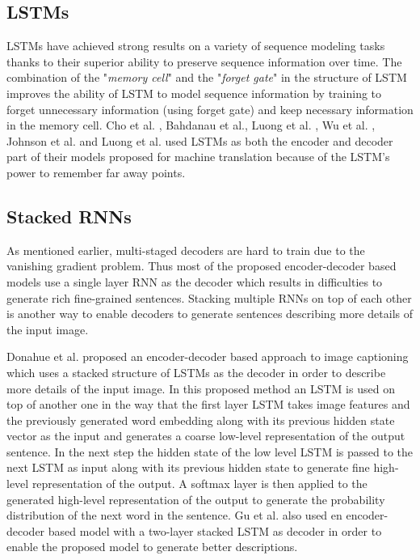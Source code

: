 \documentclass[preprint, 12pt]{elsarticle}
\begin{document}
		\subsection{LSTMs}
		LSTMs have achieved strong results on a variety of sequence modeling tasks thanks to their superior ability to preserve sequence information over time. The combination of the "\textit{memory cell}" and the "\textit{forget gate}" in the structure of LSTM improves the ability of LSTM to model sequence information by training to forget unnecessary information (using forget gate) and keep necessary information in the memory cell. Cho et al. \cite{cho2014learning}, Bahdanau et al.\cite{bahdanau2014neural}, Luong et al. \cite{luong2015effective}, Wu et al. \cite{wu2016google}, Johnson et al. \cite{johnson2017google} and Luong et al. \cite{luong2014addressing} used LSTMs as both the encoder and decoder part of their models proposed for machine translation because of the LSTM's power to remember far away points.
		\subsection{Stacked RNNs}
		As mentioned earlier, multi-staged decoders are hard to train due to the vanishing gradient problem. Thus most of the proposed encoder-decoder based models use a single layer RNN as the decoder which results in difficulties to generate rich fine-grained sentences. Stacking multiple RNNs on top of each other is another way to enable decoders to generate sentences describing more details of the input image.
		
		Donahue et al. \cite{donahue2015long} proposed an encoder-decoder based approach to image captioning which uses a stacked structure of LSTMs as the decoder in order to describe more details of the input image. In this proposed method an LSTM is used on top of another one in the way that the first layer LSTM takes image features and the previously generated word embedding along with its previous hidden state vector as the input and generates a coarse low-level representation of the output sentence. In the next step the hidden state of the low level LSTM is passed to the next LSTM as input along with its previous hidden state to generate fine high-level representation of the output. A softmax layer is then applied to the generated high-level representation of the output to generate the probability distribution of the next word in the sentence. Gu et al. \cite{gu2018stack} also used en encoder-decoder based model with a two-layer stacked LSTM as decoder in order to enable the proposed model to generate better descriptions.
		
\end{document}
